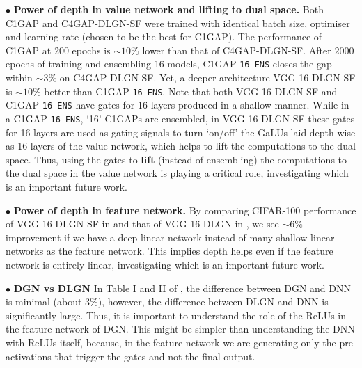 $\bullet$ \textbf{Power of depth in value network and lifting to dual space.} Both C1GAP and C4GAP-DLGN-SF were trained with identical batch size, optimiser and learning rate (chosen to be the best for C1GAP). The performance of C1GAP at $200$ epochs is $\sim10\%$ lower than that of C4GAP-DLGN-SF. After $2000$ epochs of training and ensembling 16 models, C1GAP-\texttt{16-ENS} closes the gap within $\sim 3\%$ on C4GAP-DLGN-SF. Yet, a deeper architecture VGG-16-DLGN-SF is $\sim10\%$ better than C1GAP-\texttt{16-ENS}.  Note that both VGG-16-DLGN-SF and C1GAP-\texttt{16-ENS} have gates for $16$ layers produced in a shallow manner. While in a C1GAP-\texttt{16-ENS}, `16' C1GAPs are ensembled, in VGG-16-DLGN-SF these gates for 16 layers are used as gating signals to turn `on/off' the GaLUs laid depth-wise as 16 layers of the value network, which helps to lift the computations to the dual space. Thus, using the gates to \textbf{lift} (instead of ensembling) the computations to the dual space in the value network is playing a critical role, investigating which is an important future work.%

$\bullet$ \textbf{Power of depth in feature network.} By comparing CIFAR-100 performance of VGG-16-DLGN-SF in  and that of VGG-16-DLGN in , we see $\sim 6\%$ improvement if we have a deep linear network instead of many shallow linear networks as the feature network. This implies depth helps even if the feature network is entirely linear, investigating which is an important future work. 

$\bullet$ \textbf{DGN vs DLGN} In Table I and II of , the difference between DGN and DNN is minimal (about $3\%$), however, the difference between DLGN and DNN is significantly large. Thus, it is important to understand the role of the ReLUs in the feature network of DGN. This might be simpler than understanding the DNN with ReLUs itself, because, in the feature network we are generating only the pre-activations that trigger the gates and not the final output. 

